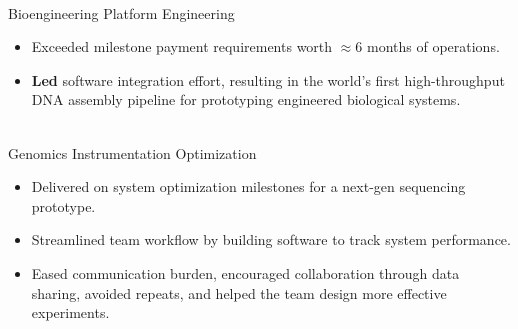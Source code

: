\documentclass[margin]{res}
\begin{document}
\begin{sloppypar}
\begin{resume}
 \\
Bioengineering Platform Engineering 
\begin{itemize}
\item Exceeded milestone payment requirements worth $\approx6$ months of operations.
\item \textbf{Led} software integration effort, resulting in the world's first high-throughput DNA assembly pipeline for prototyping engineered biological systems.
\end{itemize}

 \\
Genomics Instrumentation Optimization
\begin{itemize}
\item Delivered on system optimization milestones for a next-gen sequencing prototype.
\item Streamlined team workflow by building software to track system performance. 
\item Eased communication burden, encouraged collaboration through data sharing, avoided repeats, and helped the team design more effective experiments.
\end{itemize}


\end{resume}
\end{sloppypar}
\end{document}
